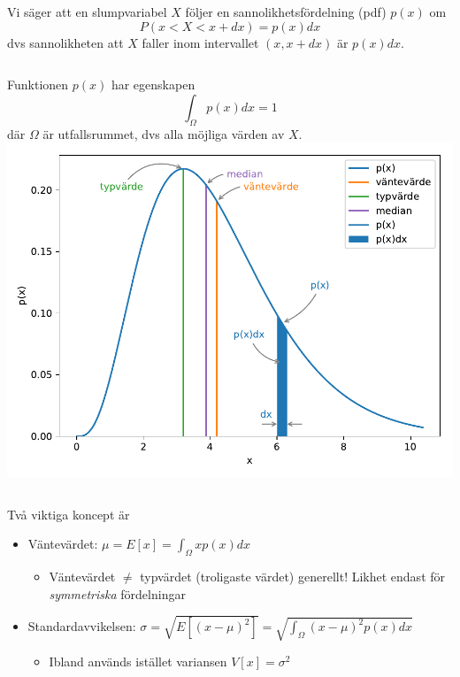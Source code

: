 \documentclass[9pt]{beamer}
\begin{document}

    \backupbegin
    
     \begin{frame}
        \onslide<+->
        Vi säger att en slumpvariabel $X$ följer en sannolikhetsfördelning (pdf) $p(x)$ om
        \begin{equation*}
            P(x < X < x + dx) = p(x)dx
        \end{equation*}
        dvs sannolikheten att $X$ faller inom intervallet $(x, x+dx)$ är $p(x)dx$.

        \vfill

        \onslide<+->
        \begin{columns}
        Funktionen $p(x)$ har egenskapen
        \begin{equation*}
            \int_\Omega p(x)dx = 1
        \end{equation*}
        där $\Omega$ är utfallsrummet, dvs alla möjliga värden av $X$.
            \includegraphics[width=\textwidth]{pdf.pdf}
        \end{columns}

        \vfill

        \onslide<+->
        Två viktiga koncept är
        \begin{itemize}
            \item Väntevärdet: $\mu = E[x] = \int_\Omega x p(x) dx$
                \begin{itemize}
                    \item Väntevärdet $\neq$ typvärdet (troligaste värdet) generellt! Likhet endast för \emph{symmetriska} fördelningar
                \end{itemize}
            \item Standardavvikelsen: $\sigma = \sqrt{E[(x - \mu)^2]} = \sqrt{\int_\Omega (x - \mu)^2p(x)dx}$
                \begin{itemize}
                    \item Ibland används istället variansen $V[x] = \sigma^2$
                \end{itemize}
        \end{itemize}
    \end{frame}
    
\end{document}
